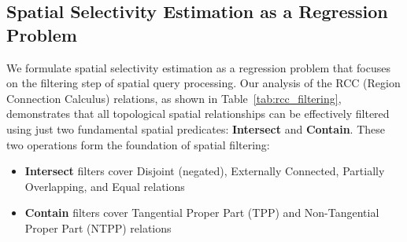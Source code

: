 \documentclass{article}
\begin{document}
\begin{table}[h]
    \centering
    \renewcommand{\arraystretch}{1.3}
    \caption{Formal Definitions of Distance-Based Filters}
    \label{tab:distance_formal}
\end{table}


\subsection{Spatial Selectivity Estimation as a Regression Problem}

We formulate spatial selectivity estimation as a regression problem that focuses on the filtering step of spatial query processing. Our analysis of the RCC (Region Connection Calculus) relations, as shown in Table~\ref{tab:rcc_filtering}, demonstrates that all topological spatial relationships can be effectively filtered using just two fundamental spatial predicates: \textbf{Intersect} and \textbf{Contain}. These two operations form the foundation of spatial filtering:

\begin{itemize}
\item \textbf{Intersect} filters cover Disjoint (negated), Externally Connected, Partially Overlapping, and Equal relations
\item \textbf{Contain} filters cover Tangential Proper Part (TPP) and Non-Tangential Proper Part (NTPP) relations
\end{itemize}
\end{document}
